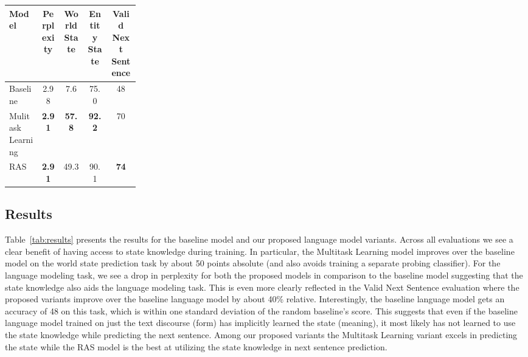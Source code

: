 \documentclass[12pt]{thesis-umich}[thesis]
\begin{document}
\begin{table*}
    \centering
      \renewcommand{\arraystretch}{1.1}

    \begin{tabular}{p{0.25 \linewidth}  c c c c 
    }
    \toprule
        \textbf{Model}  &   \textbf{Perplexity} & \textbf{World State} & \textbf{Entity State} & \textbf{Valid Next Sentence}  
        \\\midrule
        Baseline \citep{li-etal-2021-implicit}  & 2.98          & \phantom{1}7.6  &   75.0 &  48
        \\\midrule
        Mulitask Learning   & \textbf{2.91} & \textbf{57.8}  & \textbf{92.2}  & 70  
        \\
        RAS                 & \textbf{2.91}         & 49.3  & 90.1  & \textbf{74}
        \\\bottomrule
        
        

        

    \end{tabular}
    \caption{Comparison of performance of Language Model variants on the proposed evaluations. The state tracking results for the Baseline model are from \citet{li-etal-2021-implicit}.}
    \label{tab:results}
\end{table*} 

\subsection{Results}
\vspace{-0.05in}
Table~\ref{tab:results} presents the results for the baseline model and our proposed language model variants. 
Across all evaluations we see a clear benefit of having access to state knowledge during training. 
In particular, the Multitask Learning model improves over the baseline model on the world state prediction task by about 50 points absolute (and also avoids training a separate probing classifier). For the language modeling task, we see a drop in perplexity for both the proposed models in comparison to the baseline model suggesting that the state knowledge also aids the language modeling task. 
This is even more clearly reflected in the Valid Next Sentence evaluation where the proposed variants improve over the baseline language model by about 40\% relative. Interestingly, the baseline language model gets an accuracy of 48 on this task, which is within one standard deviation of the random baseline's score. 
This suggests that 
even if the baseline language model trained on just the text discourse (form) has implicitly learned the state (meaning), it most likely has not learned to use the state knowledge while predicting the next sentence. 
Among our proposed variants the Multitask Learning variant excels in predicting the state while the RAS model is the best at utilizing the state knowledge in next sentence prediction. 
\end{document}
